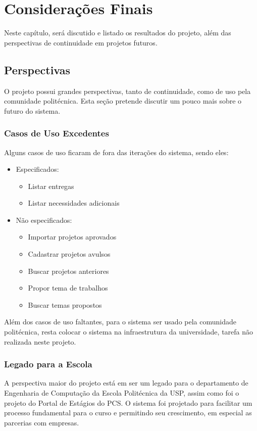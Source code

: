 \chapter{Considerações Finais}\label{chap:consideracoes-finais}
Neste capítulo, será discutido e listado os resultados do projeto, além das perspectivas de continuidade em projetos futuros.

\section{Perspectivas}
O projeto possui grandes perspectivas, tanto de continuidade, como de uso pela comunidade politécnica. Esta seção pretende discutir um pouco mais sobre o futuro do sistema.

\subsection{Casos de Uso Excedentes}
Alguns casos de uso ficaram de fora das iterações do sistema, sendo eles:

\begin{itemize}
    \item Especificados:
    \begin{itemize}
        \item Listar entregas
        \item Listar necessidades adicionais
    \end{itemize}
    
    \item Não especificados:
    \begin{itemize}
        \item Importar projetos aprovados
        \item Cadastrar projetos avulsos
        \item Buscar projetos anteriores
        \item Propor tema de trabalhos
        \item Buscar temas propostos
    \end{itemize}
\end{itemize}

Além dos casos de uso faltantes, para o sistema ser usado pela comunidade politécnica, resta colocar o sistema na infraestrutura da universidade, tarefa não realizada neste projeto.

\subsection{Legado para a Escola}
A perspectiva maior do projeto está em ser um legado para o departamento de Engenharia de Computação da Escola Politécnica da USP, assim como foi o projeto do Portal de Estágios do PCS. O sistema foi projetado para facilitar um processo fundamental para o curso e permitindo seu crescimento, em especial as parcerias com empresas.

